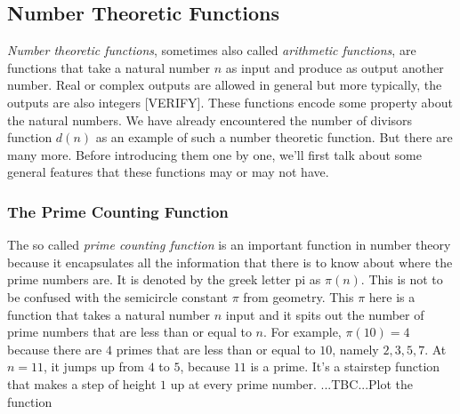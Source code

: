 
\subsection{Number Theoretic Functions}
\emph{Number theoretic functions}, sometimes also called \emph{arithmetic functions}, are functions that take a natural number $n$ as input and produce as output another number. Real or complex outputs are allowed in general but more typically, the outputs are also integers [VERIFY]. These functions encode some property about the natural numbers. We have already encountered the number of divisors function $d(n)$ as an example of such a number theoretic function. But there are many more. Before introducing them one by one, we'll first talk about some general features that these functions may or may not have.


\subsubsection{The Prime Counting Function}
The so called \emph{prime counting function} is an important function in number theory because it encapsulates all the information that there is to know about where the prime numbers are. It is denoted by the greek letter pi as $\pi(n)$. This is not to be confused with the semicircle constant $\pi$ from geometry. This $\pi$ here is a function that takes a natural number $n$ input and it spits out the number of prime numbers that are less than or equal to $n$. For example, $\pi(10) = 4$ because there are $4$ primes that are less than or equal to $10$, namely $2,3,5,7$. At $n = 11$, it jumps up from $4$ to $5$, because $11$ is a prime. It's a stairstep function that makes a step of height $1$ up at every prime number. ...TBC...Plot the function


